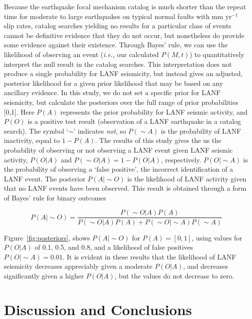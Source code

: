 \documentclass[twocolumn,grl]{AGUTeX}
\begin{document}
\begin{article}
Because the earthquake focal mechanism catalog is much shorter than the repeat
time for moderate to large earthquakes on typical normal faults with mm
yr$^{-1}$ slip rates, catalog searches yielding no results for a particular
class of events cannot be definitive evidence that they do not occur, but
nonetheless do provide some evidence against their existence. Through Bayes'
rule, we can use the likelihood of observing an event (\emph{i.e.}, our
calculated $P(M,t)$) to quantitatively interpret the null result in the catalog
searches. This interpretation does not produce a single probability for LANF
seismicity, but instead gives an adjusted, posterior likelihood for a given
prior likelihood that may be based on any ancillary evidence.  In this study,
we do not set a specific prior for LANF seismicity, but calculate the
posteriors over the full range of prior probabilities [0,1]. Here $P(A)$
represents the prior probability for LANF seismic activity, and $P(O)$ is
a positive test result (observation of a LANF earthquake in a catalog
search).  The symbol `$\sim$' indicates \emph{not}, so $P(\sim A)$ is the
probability of LANF inactivity, equal to $ 1 - P(A)$.  The results of this
study gives the us the probability of observing or not observing a LANF event
given LANF seismic activity, $P(O|A)$ and $P(\sim O | A) = 1 - P(O|A)$,
respectively. $P(O | \sim A)$ is the probability of observing a `false
positive', the incorrect identification of a LANF event.  The posterior $P(A
|\sim O)$ is the likelihood of LANF activity given that no LANF events
have been observed.  This result is obtained through a form of Bayes' rule for
binary outcomes

\begin{equation}
P(A | \sim O) = \frac{P(\sim O|A) P(A)}
{P(\sim O|A)P(A) + P(\sim O|\sim A)P(\sim A)}
\label{BayesRule}
\end{equation}

Figure~\ref{fig:posteriors}, shows $P(A|\sim O)$ for $P(A) = [0,1]$,
using values for $P(O|A)$ of 0.1, 0.5, and 0.8, and a likelihood of false positives $P(O|\sim A)= 0.01$. It is evident in these results that the likelihood of LANF seismicity decreases appreciably given a moderate $P(O|A)$, and decreases significantly given a higher $P(O|A)$, but the values do not decrease to zero.


\section{Discussion and Conclusions}


\end{article}
\end{document}
